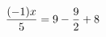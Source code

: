\documentclass[preview]{standalone}
\begin{document}
\begin{align*}
\special{dvisvgm:raw <g id='unique000'>}\frac{(-1) x}{5} = 9 - \frac{9}{2} + 8\special{dvisvgm:raw </g>}
\end{align*}
\end{document}
